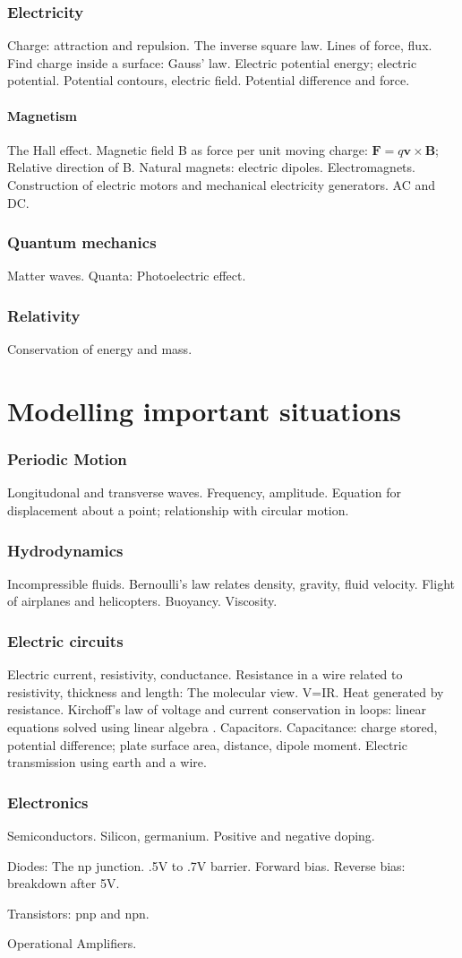 \documentclass{article}
\begin{document}
\section{Electricity}
Charge: attraction and repulsion. The inverse square law. Lines of force, flux. Find charge inside a surface: Gauss' law. Electric potential energy; electric potential. Potential contours, electric field. Potential difference and force.

\subsection{Magnetism}
The Hall effect. Magnetic field B as force per unit moving charge: $\textbf{F} = q\textbf{v}\times\textbf{B}$; Relative direction of B. Natural magnets: electric dipoles. Electromagnets. Construction of electric motors and mechanical electricity generators. AC and DC.

\section{Quantum mechanics}
Matter waves. Quanta: Photoelectric effect.

\section{Relativity}
Conservation of energy and mass.

\part{Modelling important situations}
\section{Periodic Motion}
Longitudonal and transverse waves. Frequency, amplitude. Equation for displacement about a point; relationship with circular motion.

\section{Hydrodynamics}
Incompressible fluids. Bernoulli's law relates density, gravity, fluid velocity. Flight of airplanes and helicopters. Buoyancy. Viscosity.

\section{Electric circuits}
Electric current, resistivity, conductance. Resistance in a wire related to resistivity, thickness and length: The molecular view. V=IR. Heat generated by resistance. Kirchoff's law of voltage and current conservation in loops: linear equations solved using linear algebra \cite{strang}. Capacitors. Capacitance: charge stored, potential difference; plate surface area, distance, dipole moment. Electric transmission using earth and a wire.

\section{Electronics}
Semiconductors. Silicon, germanium. Positive and negative doping.

Diodes: The np junction. .5V to .7V barrier. Forward bias. Reverse bias: breakdown after 5V.

Transistors: pnp and npn.

Operational Amplifiers.



\end{document}
